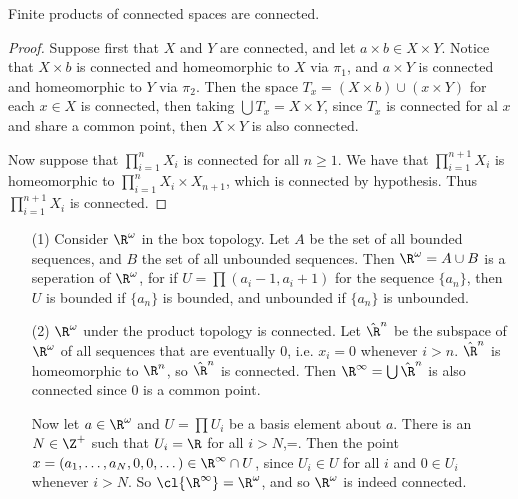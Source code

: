 \begin{theorem}\label{3.1.7}
    Finite products of connected spaces are connected.
\end{theorem}
\begin{proof}
    Suppose first that $X$ and  $Y$ are connected, and let  $a \times b \in X \times Y$. Notice that
     $X \times b$ is connected and homeomorphic to  $X$ via  $\pi_1$, and $a \times Y$ is connected
     and homeomorphic to  $Y$ via  $\pi_2$. Then the space $T_x=(X \times b) \cup (x \times Y)$ for
     each $x \in X$ is connected, then taking  $\bigcup{T_x}=X \times Y$, since $T_x$ is connected
     for al  $x$ and share a common point, then  $X \times Y$ is also connected.

     Now suppose that  $\prod_{i=1}^{n}{X_i}$ is connected for all $n \geq 1$. We have that
     $\prod_{i=1}^{n+1}{X_i}$ is homeomorphic to $\prod_{i=1}^{n}{X_i} \times X_{n+1}$, which is
     connected by hypothesis. Thus $\prod_{i=1}^{n+1}{X_i}$ is connected.
\end{proof}

\begin{example}
    \begin{enumerate}
        \item[(1)] Consider $\R^{\omega}$ in the box topology. Let $A$ be the set of all bounded
            sequences, and  $B$ the set of all unbounded sequences. Then  $\R^{\omega}=A \cup B$ is
            a seperation of $\R^{\omega}$, for if $U=\prod{(a_i-1,a_i+1)}$ for the sequence
            $\{a_n\}$, then $U$ is bounded if  $\{a_n\}$ is bounded, and unbounded if $\{a_n\}$ is
            unbounded.

        \item[(2)] $\R^{\omega}$ under the product topology is connected.
            Let $\hat{\R}^n$ be the subspace of $\R^{\omega}$ of all sequences
            that are eventually $0$, i.e.  $x_i=0$ whenever  $i>n$.
            $\hat{\R}^n$ is homeomorphic to $\R^n$, so  $\hat{\R}^n$ is
            connected. Then $\R^{\infty}=\bigcup{\hat{\R}^n}$ is also connected
            since $0$ is a common point.

            Now let  $a \in \R^{\omega}$ and $U=\prod{U_i}$ be a basis element about $a$. There is
            an  $N \in \Z^+$ such that  $U_i=\R$ for all  $i>N$,=. Then the point  $x=(a_1,\dots,
            a_N,0,0,\dots) \in \R^{\infty} \cap U$, since $U_i \in U$ for all  $i$ and  $0 \in U_i$
            whenever  $i>N$. So $\cl {\R^{\infty}}=\R^{\omega}$, and so $\R^{\omega}$ is indeed
            connected.
    \end{enumerate}
\end{example}

